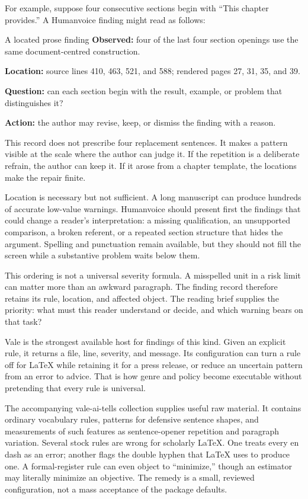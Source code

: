 For example, suppose four consecutive sections begin with ``This chapter
provides.'' A Humanvoice finding might read as follows:

\begin{plainbox}{A located prose finding}
\textbf{Observed:} four of the last four section openings use the same
document-centred construction.\par
\textbf{Location:} source lines 410, 463, 521, and 588; rendered pages 27, 31,
35, and 39.\par
\textbf{Question:} can each section begin with the result, example, or problem
that distinguishes it?\par
\textbf{Action:} the author may revise, keep, or dismiss the finding with a
reason.
\end{plainbox}

This record does not prescribe four replacement sentences. It makes a pattern
visible at the scale where the author can judge it. If the repetition is a
deliberate refrain, the author can keep it. If it arose from a chapter template,
the locations make the repair finite.

Location is necessary but not sufficient. A long manuscript can produce
hundreds of accurate low-value warnings. Humanvoice should present first the
findings that could change a reader's interpretation: a missing qualification,
an unsupported comparison, a broken referent, or a repeated section structure
that hides the argument. Spelling and punctuation remain available, but they
should not fill the screen while a substantive problem waits below them.

This ordering is not a universal severity formula. A misspelled unit in a risk
limit can matter more than an awkward paragraph. The finding record therefore
retains its rule, location, and affected object. The reading brief supplies the
priority: what must this reader understand or decide, and which warning bears
on that task?

Vale is the strongest available host for findings of this kind. Given an
explicit rule, it returns a file, line, severity, and message. Its configuration
can turn a rule off for LaTeX while retaining it for a press release, or reduce
an uncertain pattern from an error to advice. That is how genre and policy
become executable without pretending that every rule is universal.

The accompanying vale-ai-tells collection supplies useful raw material. It
contains ordinary vocabulary rules, patterns for defensive sentence shapes,
and measurements of such features as sentence-opener repetition and paragraph
variation. Several stock rules are wrong for scholarly LaTeX. One treats every
en dash as an error; another flags the double hyphen that LaTeX uses to produce
one. A formal-register rule can even object to ``minimize,'' though an estimator
may literally minimize an objective. The remedy is a small, reviewed
configuration, not a mass acceptance of the package defaults.

